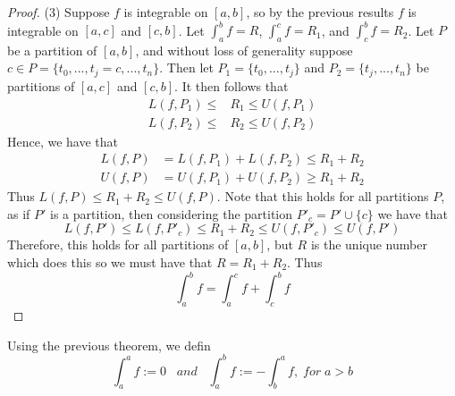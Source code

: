 \documentclass[12pt, a4paper, oneside, openright, titlepage]{book}
\begin{document}
\begin{proof}
    (3) Suppose $f$ is integrable on $[a,b]$, so by the previous results $f$ is integrable on $[a,c]$ and $[c,b]$. Let $\int_a^bf = R$, $\int_a^cf = R_1$, and $\int_c^bf = R_2$. Let $P$ be a partition of $[a,b]$, and without loss of generality suppose $c \in P = \{t_0,...,t_j = c,...,t_n\}$. Then let $P_1 = \{t_0,...,t_j\}$ and $P_2 = \{t_j,...,t_n\}$ be partitions of $[a,c]$ and $[c,b]$. It then follows that \begin{align*}
        L(f,P_1) \leq &R_1 \leq U(f,P_1) \\
        L(f,P_2) \leq &R_2 \leq U(f,P_2)
    \end{align*}
    Hence, we have that \begin{align*}
        L(f,P) &= L(f,P_1) + L(f,P_2) \leq R_1 + R_2 \\
        U(f,P) &= U(f,P_1) + U(f,P_2) \geq R_1 + R_2
    \end{align*}
    Thus $L(f,P) \leq R_1 + R_2\leq U(f,P)$. Note that this holds for all partitions $P$, as if $P'$ is a partition, then considering the partition $P'_{c} = P' \cup \{c\}$ we have that $$L(f,P') \leq L(f,P'_{c}) \leq R_1 + R_2 \leq U(f,P'_{c}) \leq U(f,P')$$
    Therefore, this holds for all partitions of $[a,b]$, but $R$ is the unique number which does this so we must have that $R = R_1 + R_2$. Thus \begin{equation*}
        \int_a^bf = \int_a^cf + \int_c^bf
    \end{equation*}
\end{proof}


\begin{defn}
    Using the previous theorem, we defin \begin{equation}
        \int_a^af := 0 \;\;\;and\;\;\;\int_a^bf := -\int_b^af,\;for\;a>b
    \end{equation}
\end{defn}
\end{document}
